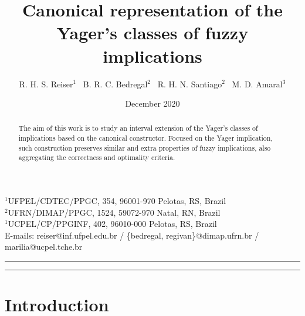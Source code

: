 \documentclass[12pt]{article}
\title{Canonical representation of the Yager's classes of fuzzy implications}
\author{\scriptsize R. H. S. Reiser$^{1}$ \  B. R. C. Bedregal$^{2}$ \ R. H. N. Santiago$^{2}$ \ M. D. Amaral$^{3}$
}
\date{December 2020}
\theoremstyle{plain}
\theoremstyle{remark}
\theoremstyle{definition}
\theoremstyle{proposition}
\begin{document}
\maketitle

\vspace{-20pt}
\begin{center}
{\footnotesize $^1$UFPEL/CDTEC/PPGC, 354, 96001-970 Pelotas, RS, Brazil \\
$^2$UFRN/DIMAP/PPGC, 1524, 59072-970 Natal, RN, Brazil \\
$^1$UCPEL/CP/PPGINF, 402, 96010-000  Pelotas, RS, Brazil \\
E-mails: reiser@inf.ufpel.edu.br / \{bedregal, regivan\}@dimap.ufrn.br  / marilia@ucpel.tche.br
}\end{center}

\hrule

\begin{abstract}
The aim of this work is to study an interval extension of the Yager's classes of implications based on the canonical constructor. Focused on the Yager implication, such construction preserves similar and extra properties of fuzzy implications, also aggregating the correctness and optimality criteria.

\end{abstract}

\medskip
\noindent
{}

\medskip
\noindent
{}
\medskip

\hrule

\section{Introduction}\label{sec:1}
\end{document}
